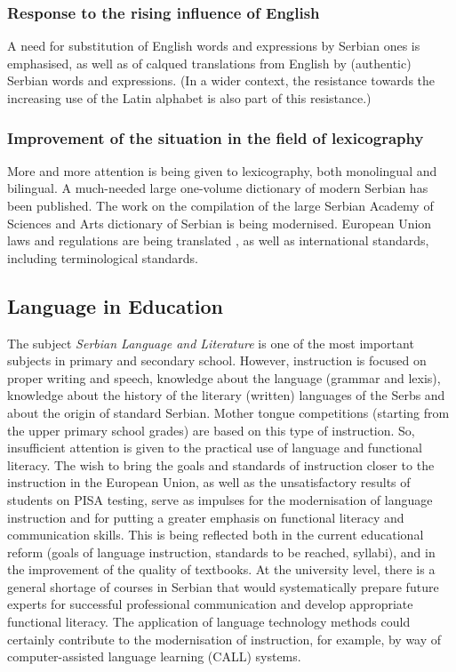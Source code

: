 \begin{multicols}{2}
 \subsubsection {Response to the rising influence of English}
 
 A need for substitution of English words and expressions by Serbian ones is emphasised, as well as of calqued translations from English by (authentic) Serbian words and expressions. (In a wider context, the resistance towards the increasing use of the Latin alphabet is also part of this resistance.)
 

 \subsubsection {Improvement of the situation in the field of lexicography}
   
 
 More and more attention is being given to lexicography, both monolingual and bilingual. A much-needed large one-volume dictionary of modern Serbian has been published. The work on the compilation of the large Serbian Academy of Sciences and Arts dictionary of Serbian is being modernised.
European Union laws and regulations are being translated \cite{SEIO}, as well as international standards, \cite{ISS} including terminological standards.
 
 \subsection {Language in Education}
   
The subject \textit{Serbian Language and Literature} is one of the most important subjects in primary and secondary school. However, instruction is focused on proper writing and speech, knowledge about the language (grammar and lexis), knowledge about the history of the literary (written) languages of the Serbs and about the origin of standard Serbian. Mother tongue competitions (starting from the upper primary school grades) are based on this type of instruction. So, insufficient attention is given to the practical use of language and functional literacy.  
The wish to bring the goals and standards of instruction closer to the instruction in the European Union, as well as the unsatisfactory results of students on PISA testing, serve as impulses for the modernisation of language instruction and for putting a greater emphasis on functional literacy and communication skills. This is being reflected both in the current educational reform (goals of language instruction, standards to be reached, syllabi), and in the improvement of the quality of textbooks. At the university level, there is a general shortage of courses in Serbian that would systematically prepare future experts for successful professional communication and develop appropriate functional literacy.
The application of language technology methods could certainly contribute to the modernisation of instruction, for example, by way of computer-assisted language learning (CALL) systems.  


\end{multicols}
